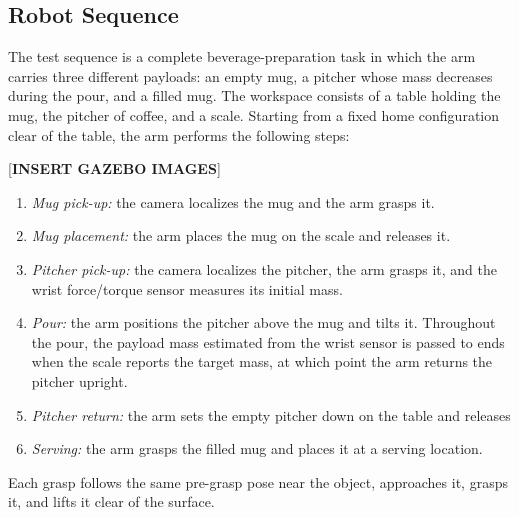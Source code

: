 \documentclass[conference]{IEEEtran}
\begin{document}
\subsection{Robot Sequence}
The test sequence is a complete beverage-preparation task in which the arm
carries three different payloads: an empty mug, a pitcher whose mass
decreases during the pour, and a filled mug. The workspace consists of a
table holding the mug, the pitcher of coffee, and a scale. Starting from a
fixed home configuration clear of the table, the arm performs the following
steps:

[\textbf{INSERT GAZEBO IMAGES}]
\begin{enumerate}
    \item \textit{Mug pick-up:} the camera localizes the mug
          and the arm grasps it.
    \item \textit{Mug placement:} the arm places the mug on the scale and
          releases it.
    \item \textit{Pitcher pick-up:} the camera localizes the pitcher, the arm
          grasps it, and the wrist force/torque sensor measures its initial
          mass.
    \item \textit{Pour:} the arm positions the pitcher above the mug and tilts
          it. Throughout the pour, the payload mass estimated from the wrist
          sensor is passed to ends when the
          scale reports the target mass, at which point the arm returns the
          pitcher upright.
    \item \textit{Pitcher return:} the arm sets the empty pitcher down on the
          table and releases
    \item \textit{Serving:} the arm grasps the filled mug and places it at a
          serving location.
\end{enumerate}
Each grasp follows the same pre-grasp pose near
the object, approaches it, grasps it, and lifts it clear of the surface. 
\end{document}
